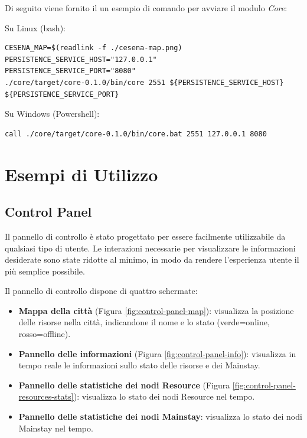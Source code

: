 \documentclass{scrartcl}
\begin{document}
Di seguito viene fornito il un esempio di comando per avviare il modulo \textit{Core}:

Su Linux (bash):
\begin{lstlisting}
CESENA_MAP=$(readlink -f ./cesena-map.png)
PERSISTENCE_SERVICE_HOST="127.0.0.1"
PERSISTENCE_SERVICE_PORT="8080"
./core/target/core-0.1.0/bin/core 2551 ${PERSISTENCE_SERVICE_HOST} ${PERSISTENCE_SERVICE_PORT}
\end{lstlisting}

Su Windows (Powershell):
\begin{lstlisting}
call ./core/target/core-0.1.0/bin/core.bat 2551 127.0.0.1 8080
\end{lstlisting}

\section{Esempi di Utilizzo}

\subsection{Control Panel}

Il pannello di controllo è stato progettato per essere facilmente utilizzabile da qualsiasi tipo di utente. Le interazioni necessarie per visualizzare le informazioni desiderate sono state ridotte al minimo, in modo da rendere l'esperienza utente il più semplice possibile.

Il pannello di controllo dispone di quattro schermate:

\begin{itemize}
    \item \textbf{Mappa della città} (Figura \ref{fig:control-panel-map}): visualizza la posizione delle risorse nella città, indicandone il nome e lo stato (verde=online, rosso=offline).
    \item \textbf{Pannello delle informazioni} (Figura \ref{fig:control-panel-info}): visualizza in tempo reale le informazioni sullo stato delle risorse e dei Mainstay.
    \item \textbf{Pannello delle statistiche dei nodi Resource} (Figura \ref{fig:control-panel-resources-stats}): visualizza lo stato dei nodi Resource nel tempo.
    \item \textbf{Pannello delle statistiche dei nodi Mainstay}: visualizza lo stato dei nodi Mainstay nel tempo.
\end{itemize}
\end{document}
